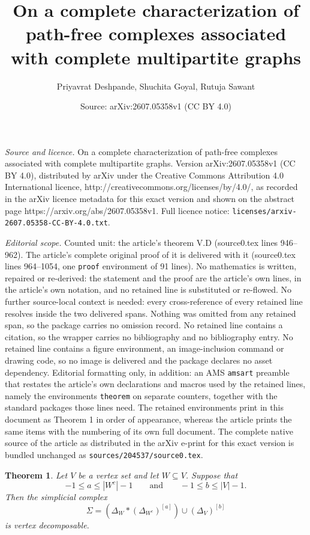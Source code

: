\documentclass[10pt,a4paper]{amsart}
\title{On a complete characterization of path-free complexes associated with complete multipartite graphs}
\author{Priyavrat Deshpande, Shuchita Goyal, Rutuja Sawant}
\date{Source: arXiv:2607.05358v1 (CC BY 4.0)}
\newtheorem{theorem}{Theorem}
\begin{document}
\maketitle

\noindent\emph{Source and licence.} On a complete characterization of path-free complexes associated with complete multipartite graphs. Version arXiv:2607.05358v1 (CC BY 4.0), distributed by arXiv under the Creative Commons Attribution 4.0 International licence, http://creativecommons.org/licenses/by/4.0/, as recorded in the arXiv licence metadata for this exact version and shown on the abstract page https://arxiv.org/abs/2607.05358v1. Full licence notice: \texttt{licenses/arxiv-2607.05358-CC-BY-4.0.txt}.\par\smallskip

\noindent\textit{Editorial scope.} Counted unit: the article's theorem V.D (source0.tex lines 946--962). The article's complete original proof of it is delivered with it (source0.tex lines 964--1054, one \texttt{proof} environment of 91 lines). No mathematics is written, repaired or re-derived: the statement and the proof are the article's own lines, in the article's own notation, and no retained line is substituted or re-flowed.  No further source-local context is needed: every cross-reference of every retained line resolves inside the two delivered spans.  Nothing was omitted from any retained span, so the package carries no omission record.  No retained line contains a citation, so the wrapper carries no bibliography and no bibliography entry.  No retained line contains a figure environment, an image-inclusion command or drawing code, so no image is delivered and the package declares no asset dependency.  Editorial formatting only, in addition: an AMS \texttt{amsart} preamble that restates the article's own declarations and macros used by the retained lines, namely the environments \texttt{theorem} on separate counters, together with the standard packages those lines need.  The retained environments print in this document as Theorem 1 in order of appearance, whereas the article prints the same items with the numbering of its own full document.  The complete native source of the article as distributed in the arXiv e-print for this exact version is bundled unchanged as \texttt{sources/204537/source0.tex}.
\begin{theorem}\label{them: General V.D}
Let $V$ be a vertex set and let $W \subseteq V$. Suppose that
\[
-1 \le a \le |W^{c}|-1
\qquad \text{and} \qquad
-1 \le b \le |V|-1.
\]
Then the simplicial complex
\[
\Sigma
=
\left(\Delta_{W} * (\Delta_{W^{c}})^{[a]} \right)
\cup
(\Delta_{V})^{[b]}
\]
is vertex decomposable.
\end{theorem}
\end{document}
